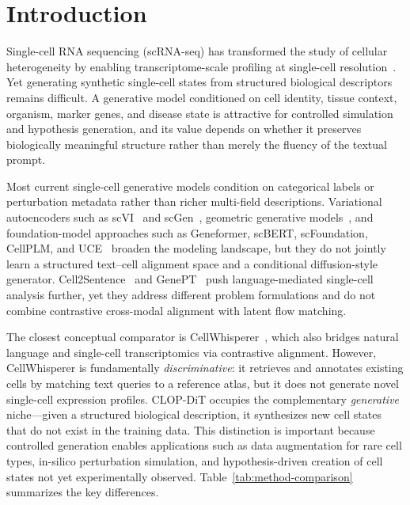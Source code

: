 \documentclass[genes,article,submit,pdftex,oneauthor]{Definitions/mdpi}
\begin{document}
\section{Introduction}

Single-cell RNA sequencing (scRNA-seq) has transformed the study of cellular heterogeneity by enabling transcriptome-scale profiling at single-cell resolution~\cite{ref-scrnaseq-review,ref-10x}. Yet generating synthetic single-cell states from structured biological descriptors remains difficult. A generative model conditioned on cell identity, tissue context, organism, marker genes, and disease state is attractive for controlled simulation and hypothesis generation, and its value depends on whether it preserves biologically meaningful structure rather than merely the fluency of the textual prompt.

Most current single-cell generative models condition on categorical labels or perturbation metadata rather than richer multi-field descriptions. Variational autoencoders such as scVI~\cite{ref-scvi,ref-scvi-tools} and scGen~\cite{ref-scgen}, geometric generative models~\cite{ref-scdiff}, and foundation-model approaches such as Geneformer, scBERT, scFoundation, CellPLM, and UCE~\cite{ref-geneformer,ref-scbert,ref-scfoundation,ref-cellplm,ref-uce} broaden the modeling landscape, but they do not jointly learn a structured text--cell alignment space and a conditional diffusion-style generator. Cell2Sentence~\cite{ref-cell2sentence} and GenePT~\cite{ref-genept} push language-mediated single-cell analysis further, yet they address different problem formulations and do not combine contrastive cross-modal alignment with latent flow matching.

The closest conceptual comparator is CellWhisperer~\cite{ref-cellwhisperer}, which also bridges natural language and single-cell transcriptomics via contrastive alignment. However, CellWhisperer is fundamentally \emph{discriminative}: it retrieves and annotates existing cells by matching text queries to a reference atlas, but it does not generate novel single-cell expression profiles. CLOP-DiT occupies the complementary \emph{generative} niche---given a structured biological description, it synthesizes new cell states that do not exist in the training data. This distinction is important because controlled generation enables applications such as data augmentation for rare cell types, in-silico perturbation simulation, and hypothesis-driven creation of cell states not yet experimentally observed. Table~\ref{tab:method-comparison} summarizes the key differences.
\end{document}
